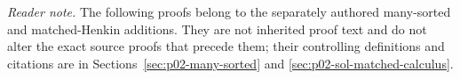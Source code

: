 
\noindent\textit{Reader note.}  The following proofs belong to the separately
authored many-sorted and matched-Henkin additions.  They are not inherited
proof text and do not alter the exact source proofs that precede them; their
controlling definitions and citations are in
Sections~\ref{sec:p02-many-sorted} and
\ref{sec:p02-sol-matched-calculus}.

